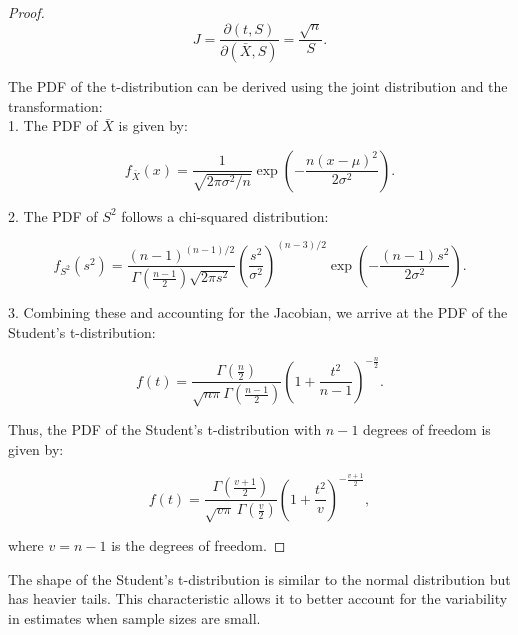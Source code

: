 \begin{proof}
\[
J = \frac{\partial(t, S)}{\partial(\bar{X}, S)} = \frac{\sqrt{n}}{S}.
\]

The PDF of the t-distribution can be derived using the joint distribution and the transformation:\\

1. The PDF of \( \bar{X} \) is given by:

   \[
   f_{\bar{X}}(x) = \frac{1}{\sqrt{2\pi \sigma^2/n}} \exp\left(-\frac{n(x - \mu)^2}{2\sigma^2}\right).
   \]

2. The PDF of \( S^2 \) follows a chi-squared distribution:

   \[
   f_{S^2}(s^2) = \frac{(n-1)^{(n-1)/2}}{\Gamma\left(\frac{n-1}{2}\right) \sqrt{2\pi s^2}} \left( \frac{s^2}{\sigma^2} \right)^{(n-3)/2} \exp\left(-\frac{(n-1)s^2}{2\sigma^2}\right).
   \]

3. Combining these and accounting for the Jacobian, we arrive at the PDF of the Student's t-distribution:

\[
f(t) = \frac{\Gamma\left(\frac{n}{2}\right)}{\sqrt{n \pi} \Gamma\left(\frac{n-1}{2}\right)} \left(1 + \frac{t^2}{n-1}\right)^{-\frac{n}{2}}.
\]

Thus, the PDF of the Student's t-distribution with \( n-1 \) degrees of freedom is given by:

\[
f(t) = \frac{\Gamma\left(\frac{v+1}{2}\right)}{\sqrt{v \pi} \, \Gamma\left(\frac{v}{2}\right)} \left(1 + \frac{t^2}{v}\right)^{-\frac{v+1}{2}},
\]

where \( v = n - 1 \) is the degrees of freedom.
\end{proof}

The shape of the Student's t-distribution is similar to the normal distribution but has heavier tails. This characteristic allows it to better account for the variability in estimates when sample sizes are small. 

\begin{center}
    
\end{center}

